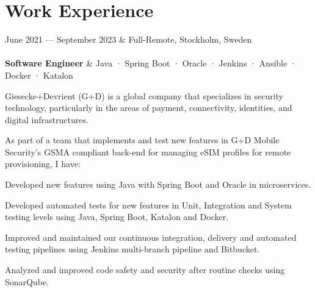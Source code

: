 \documentclass{cv-stylish}
\begin{document}
\begin{center}
\begin{adjustwidth}{1cm}{1cm}



\end{adjustwidth}


\section{Work Experience}


\begin{JobTable}
  June 2021 --- September 2023 & \hfill Full-Remote, Stockholm, Sweden \\
   \\[3pt]
  \hspace{5mm} \textbf{Software Engineer}
  & \hfill Java · Spring Boot · Oracle · Jenkins · Ansible · Docker · Katalon \\
\end{JobTable}
\begin{adjustwidth}{0.015\linewidth}{0.015\linewidth}
Giesecke+Devrient (G+D) is a global company that specializes in
security technology, particularly in the areas of payment,
connectivity, identities, and digital infrastructures.

As part of a team that implements and test new features in G+D Mobile
Security's GSMA compliant back-end for managing eSIM profiles for
remote provisioning, I have:

\begin{compactitem}
  \item Developed new features using Java with Spring Boot and Oracle in
    microservices.
  \item Developed automated tests for new features in Unit, Integration and
    System testing levels using Java, Spring Boot, Katalon and Docker.
  \item Improved and maintained our continuous integration, delivery
    and automated testing pipelines using Jenkins multi-branch
    pipeline and Bitbucket.
  \item Analyzed and improved code safety and security after routine
    checks using SonarQube.
\end{compactitem}
\end{adjustwidth}


\end{center}
\end{document}

